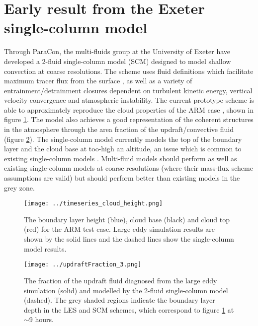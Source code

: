 \documentclass[a4paper,12pt]{article}
\begin{document}
\section{Early result from the Exeter single-column model}

Through ParaCon, the multi-fluids group at the University of Exeter have developed a 2-fluid single-column model (SCM) designed to model shallow convection at coarse resolutions. The scheme uses fluid definitions which facilitate maximum tracer flux from the surface \cite[]{efstathiou2019}, as well as a variety of entrainment/detrainment closures dependent on turbulent kinetic energy, vertical velocity convergence and atmospheric instability. The current prototype scheme is able to approximately reproduce the cloud properties of the ARM case \cite[]{brown2002}, shown in figure \ref{fig_clouds}. The model also achieves a good representation of the coherent structures in the atmosphere through the area fraction of the updraft/convective fluid (figure \ref{fig_area_fraction}). The single-column model currently models the top of the boundary layer and the cloud base at too-high an altitude, an issue which is common to existing single-column models \cite[e.g.][]{neggers2004,angevine2010}. Multi-fluid models should perform as well as existing single-column models at coarse resolutions (where their mass-flux scheme assumptions are valid) but should perform better than existing models in the grey zone. \\

\begin{figure}[h!]
	\centering
	\texttt{[image: ../timeseries\_cloud\_height.png]}
	\caption{The boundary layer height (blue), cloud base (black) and cloud top (red) for the ARM test case. Large eddy simulation results are shown by the solid lines and the dashed lines show the single-column model results.}
	\label{fig_clouds}
\end{figure}

\begin{figure}[h!]
	\centering
	\texttt{[image: ../updraftFraction\_3.png]}
	\caption{The fraction of the updraft fluid diagnosed from the large eddy simulation (solid) and modelled by the 2-fluid single-column model (dashed). The grey shaded regions indicate the boundary layer depth in the LES and SCM schemes, which correspond to figure \ref{fig_clouds} at $\sim$9 hours.}
	\label{fig_area_fraction}
\end{figure}


\end{document}
